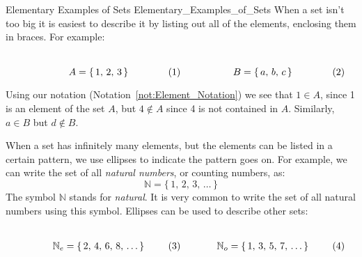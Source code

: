         \begin{lexample}{Elementary Examples of Sets}
                        {Elementary_Examples_of_Sets}
            When a set isn't too big it is easiest to describe it by
            listing out all of the elements, enclosing them in
            braces. For example:
            \par
            \begin{subequations}
                \begin{minipage}{0.49\textwidth}
                    \centering
                    \begin{equation}
                        A=\{\,1,\,2,\,3\,\}
                    \end{equation}
                \end{minipage}
                \hfill
                \begin{minipage}{0.49\textwidth}
                    \centering
                    \begin{equation}
                        B=\{\,a,\,b,\,c\,\}
                    \end{equation}
                \end{minipage}
            \end{subequations}
            \par\vspace{2.5ex}
            Using our notation (Notation~\ref{not:Element_Notation})
            we see that $1\in{A}$, since 1 is an element of the set $A$,
            but $4\notin{A}$ since 4 is not contained in $A$.
            Similarly, $a\in{B}$ but $d\notin{B}$.
        \end{lexample}
        When a set has infinitely many elements, but the elements can
        be listed in a certain pattern, we use ellipses to indicate
        the pattern goes on. For example, we can write the set of all
        \textit{natural numbers}, or counting numbers, as:
        \begin{equation}
            \mathbb{N}=\{\,1,\,2,\,3,\,\hdots\,\}
        \end{equation}
        The symbol $\mathbb{N}$ stands for \textit{natural}. It is
        very common to write the set of all natural numbers using this
        symbol. Ellipses can be used to describe other sets:
        \par
        \begin{subequations}
            \begin{minipage}{0.49\textwidth}
                \centering
                \begin{equation}
                    \mathbb{N}_{e}=\{\,2,\,4,\,6,\,8,\,\hdots\,\}
                \end{equation}
            \end{minipage}
            \hfill
            \begin{minipage}{0.49\textwidth}
                \centering
                \begin{equation}
                    \mathbb{N}_{o}=\{\,1,\,3,\,5,\,7,\,\hdots\,\}
                \end{equation}
            \end{minipage}
        \end{subequations}
